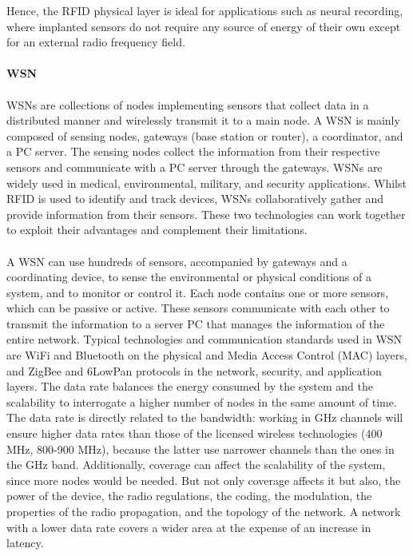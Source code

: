 \documentclass[12pt, letterpaper]{article}
\begin{document}
Hence, the RFID physical layer is ideal for applications such as neural recording, where implanted
sensors do not require any source of energy of their own except for an external radio frequency field.
\\ \ \\
\textbf{WSN}
\\ \ \\
WSNs are collections of nodes implementing sensors that collect data in a distributed manner
and wirelessly transmit it to a main node. A WSN is mainly composed of sensing nodes, gateways
(base station or router), a coordinator, and a PC server. The sensing nodes collect the information from
their respective sensors and communicate with a PC server through the gateways. WSNs are widely
used in medical, environmental, military, and security applications.
Whilst RFID is used to identify and track devices, WSNs collaboratively gather and provide
information from their sensors. These two technologies can work together to exploit their advantages
and complement their limitations.
\\ \ \\
A WSN can use hundreds of sensors,
accompanied by gateways and a coordinating device, to sense the environmental or physical conditions
of a system, and to monitor or control it. Each node contains one or more sensors, which can be passive
or active. These sensors communicate with each other to transmit the information to a server PC
that manages the information of the entire network. Typical technologies and communication
standards used in WSN are WiFi and Bluetooth on the physical and Media Access Control (MAC) layers,
and ZigBee and 6LowPan protocols in the network, security, and application layers. The data rate balances the
energy consumed by the system and the scalability to interrogate a
higher number of nodes in the same amount of time. The data rate is directly related to the bandwidth:
working in GHz channels will ensure higher data rates than those of the licensed wireless technologies
(400 MHz, 800-900 MHz), because the latter use narrower channels than the ones in the GHz band.
Additionally, coverage can affect the scalability of the system, since more nodes would be needed.
But not only coverage affects it but also, the power of the device, the radio regulations, the coding,
the modulation, the properties of the radio propagation, and the topology of the network. A network
with a lower data rate covers a wider area at the expense of an increase in latency.
\\ \ \\
\end{document}
